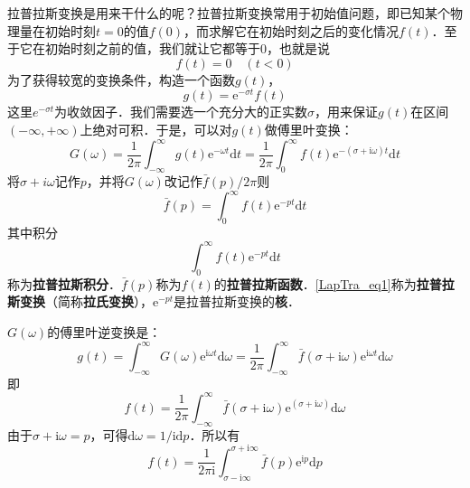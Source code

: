 
拉普拉斯变换是用来干什么的呢？拉普拉斯变换常用于初始值问题，即已知某个物理量在初始时刻$t=0$的值$f(0)$，而求解它在初始时刻之后的变化情况$f(t)$．至于它在初始时刻之前的值，我们就让它都等于$0$，也就是说
\begin{equation}
f(t)=0 \quad(t<0)
\end{equation}
为了获得较宽的变换条件，构造一个函数$g(t)$，
\begin{equation}
g(t)=\mathrm{e}^{-\sigma t} f(t)
\end{equation}
这里$e^{-\sigma t}$为收敛因子．我们需要选一个充分大的正实数$\sigma$，用来保证$g(t) $在区间$(-\infty,+\infty)$上绝对可积．于是，可以对$g(t) $做傅里叶变换：
\begin{equation}
G(\omega)=\frac{1}{2 \pi} \int_{-\infty}^{\infty} g(t) \mathrm{e}^{-\omega t} \mathrm{d} t=\frac{1}{2 \pi} \int_{0}^{\infty} f(t) \mathrm{e}^{-(\sigma+\mathrm{i} \omega) t} \mathrm{d} t
\end{equation}
将$\sigma+i \omega$记作$p$，并将$G(\omega)$改记作$\bar f(p) / 2 \pi$则
\begin{equation} \label{LapTra_eq1}
\bar{f}(p)=\int_{0}^{\infty} f(t) \mathrm{e}^{-p t} \mathrm{d} t
\end{equation}
其中积分
\begin{equation}
\int_{0}^{\infty} f(t) \mathrm{e}^{-p t} \mathrm{d} t
\end{equation}
称为\textbf{拉普拉斯积分}．$\bar f(p)$称为$f(t)$的\textbf{拉普拉斯函数}．\autoref{LapTra_eq1}称为\textbf{拉普拉斯变换}（简称\textbf{拉氏变换}），$\mathrm e^{-pt}$是拉普拉斯变换的\textbf{核}．

$G(\omega)$的傅里叶逆变换是：
\begin{equation}
g(t)=\int_{-\infty}^{\infty} G(\omega) \mathrm{e}^{\mathrm{i} \omega t} \mathrm{d} \omega=\frac{1}{2 \pi} \int_{-\infty}^{\infty} \bar{f}(\sigma+\mathrm{i} \omega) \mathrm{e}^{\mathrm{i} \omega t} \mathrm{d} \omega
\end{equation}
即
\begin{equation}
f(t)=\frac{1}{2 \pi} \int_{-\infty}^{\infty} \bar{f}(\sigma+\mathrm{i} \omega) \mathrm{e}^{(\sigma+\mathrm{i} \omega)} \mathrm{d} \omega
\end{equation}
由于$\sigma+\mathrm i\omega=p$，可得$\mathrm d\omega = 1/\mathrm i\mathrm dp$．所以有
\begin{equation}
f(t)=\frac{1}{2 \pi \mathrm{i}} \int_{\sigma-\mathrm{i} \infty}^{\sigma+\mathrm{i} \infty} \bar{f}(p) \mathrm{e}^{\mathrm{i} p} \mathrm{d} p
\end{equation}

